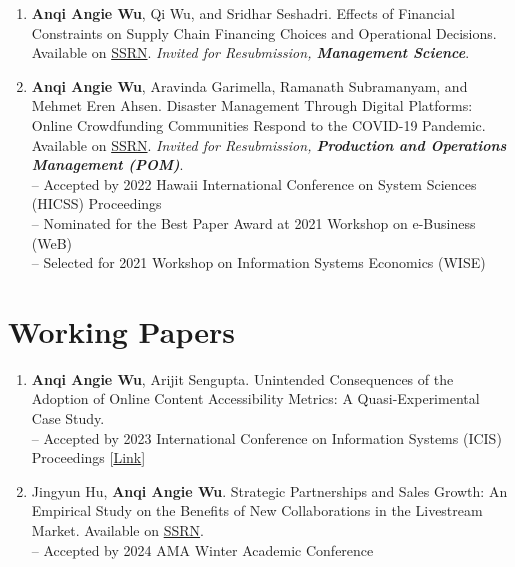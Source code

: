 \documentclass[margin,line]{resume}
\begin{document}
\begin{resume}
\begin{enumerate}[topsep=0pt, leftmargin=*]
        \item \textbf{Anqi Angie Wu}, Qi Wu, and Sridhar Seshadri. Effects of Financial Constraints on Supply Chain Financing Choices and Operational Decisions. Available on \href{https://ssrn.com/abstract=4603080}{{SSRN}}. \textit{Invited for Resubmission, \textbf{Management Science}}. \\[-0.5em]  
       
         \item \textbf{Anqi Angie Wu}, Aravinda Garimella, Ramanath Subramanyam, and Mehmet Eren Ahsen. Disaster Management Through Digital Platforms: Online Crowdfunding Communities Respond to the COVID-19 Pandemic. Available on \href{https://papers.ssrn.com/abstract=3779438}{{SSRN}}. \textit{Invited for Resubmission, \textbf{Production and Operations Management (POM)}}. \\ 	     [0.3em]
         -- Accepted by 2022 Hawaii International Conference on System Sciences (HICSS) Proceedings\\
         -- Nominated for the Best Paper Award at 2021 Workshop on e-Business (WeB)\\
         -- Selected for 2021 Workshop on Information Systems Economics (WISE)

 	  \end{enumerate}   

\section{\mysidestyle Working Papers}  	  \begin{enumerate}[topsep=0pt, leftmargin=*]     
       \item \textbf{Anqi Angie Wu}, Arijit Sengupta. Unintended Consequences of the Adoption of Online Content Accessibility Metrics: A Quasi-Experimental Case Study. %
       \\[0.3em]
       -- Accepted by 2023 International Conference on Information Systems (ICIS) Proceedings [\href{https://aisel.aisnet.org/icis2023/soc_impactIS/soc_impactIS/15/}{Link}]\\[-0.5em]
    \newpage 
           \item Jingyun Hu, \textbf{Anqi Angie Wu}. Strategic Partnerships and Sales Growth: An Empirical Study on the Benefits of New Collaborations in the Livestream Market. Available on \href{https://papers.ssrn.com/abstract=4656779}{{SSRN}}. \\[0.3em]
       -- Accepted by 2024 AMA Winter Academic Conference\\[-0.5em]


\end{enumerate}
\end{resume}
\end{document}
